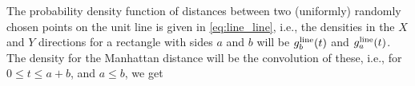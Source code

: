 The probability density function of distances between two (uniformly)
randomly chosen points on the unit line is given in
\eqref{eq:line_line}, i.e., the densities in the $X$ and $Y$
directions for a rectangle with sides $a$ and $b$ will be $g^{\rm
  line}_b(t)$ and $g^{\rm line}_a(t)$.
The density for the Manhattan distance will be the convolution of
these, i.e., for $0 \leq t \leq a+b$, and $a \leq b$, we get
